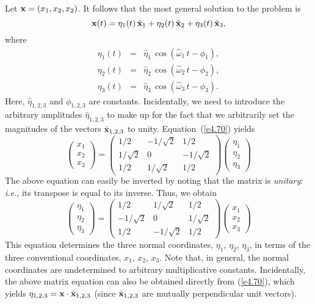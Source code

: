 {Let ${\bf x}=(x_1,x_2,x_2)$. It follows that the most general solution to the problem is
\begin{equation}\label{e4.70}
{\bf x}(t) = \eta_1(t)\,\hat{\bf x}_1 + \eta_2(t)\,\hat{\bf x}_2+\eta_3(t)\,\hat{\bf x}_3,
\end{equation}
where
\begin{eqnarray}
\eta_1(t) &=&\hat{\eta}_1\,\cos(\hat{\omega}_1\,t-\phi_1),\\[0.5ex]
\eta_2(t) &=&\hat{\eta}_2\,\cos(\hat{\omega}_2\,t-\phi_2),\\[0.5ex]
\eta_3(t) &=&\hat{\eta}_3\,\cos(\hat{\omega}_3\,t-\phi_3).
\end{eqnarray}
Here, $\hat{\eta}_{1,2,3}$ and $\phi_{1,2,3}$ are constants. Incidentally, we need to introduce the arbitrary amplitudes
$\hat{\eta}_{1,2,3}$ to make up for the fact that we arbitrarily set the magnitudes of the vectors $\hat{\bf x}_{1,2,3}$ to unity.
Equation~(\ref{e4.70}) yields
\begin{equation}
\left(\begin{array}{c}x_1\\[0.5ex]x_2\\[0.5ex]x_3\end{array}\right)
=
\left(\begin{array}{ccc}
1/2&-1/\sqrt{2}&1/2\\[0.5ex]
1/\sqrt{2}&0&-1/\sqrt{2}\\[0.5ex]
1/2&1/\sqrt{2}&1/2
\end{array}\right)\left(\begin{array}{c}\eta_1\\[0.5ex]\eta_2\\[0.5ex]\eta_3\end{array}\right)
\end{equation}
The above equation can easily be inverted by noting that the matrix
is {\em unitary}: {\em i.e.}, its transpose is equal to its inverse. 
Thus, we obtain
\begin{equation}
\left(\begin{array}{c}\eta_1\\[0.5ex]\eta_2\\[0.5ex]\eta_3\end{array}\right)
=
\left(\begin{array}{ccc}
1/2&1/\sqrt{2}&1/2\\[0.5ex]
-1/\sqrt{2}&0&1/\sqrt{2}\\[0.5ex]
1/2&-1/\sqrt{2}&1/2
\end{array}\right)\left(\begin{array}{c}x_1\\[0.5ex]x_2\\[0.5ex]x_3\end{array}\right)
\end{equation}
This equation determines the three normal coordinates, $\eta_1$, $\eta_2$, $\eta_3$,
in terms of the three conventional coordinates, $x_1$, $x_2$, $x_3$. Note that, in general, 
the normal coordinates are undetermined to arbitrary multiplicative constants.
Incidentally, the above matrix equation can also be obtained directly from (\ref{e4.70}), which yields
$\eta_{1,2,3}={\bf x}\cdot\hat{\bf x}_{1,2,3}$ (since $\hat{\bf x}_{1,2,3}$ are mutually perpendicular unit
vectors). 

}
